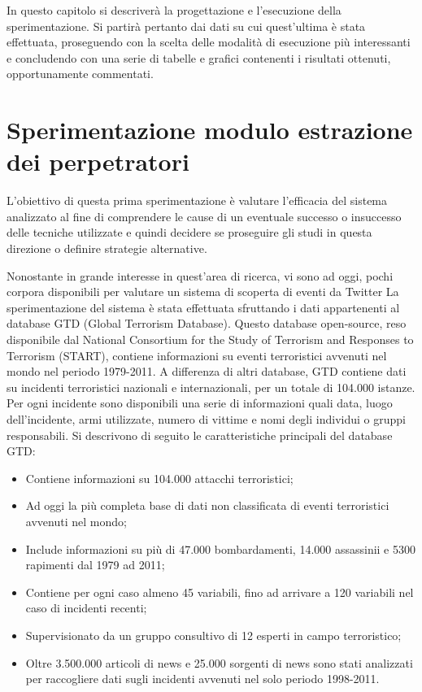 

In questo capitolo si descriverà la progettazione e l'esecuzione della sperimentazione. Si partirà pertanto dai dati su cui quest'ultima è stata effettuata, proseguendo con la scelta delle modalità di esecuzione più interessanti e concludendo con una serie di tabelle e grafici contenenti i risultati ottenuti, opportunamente commentati.  
\section{Sperimentazione modulo estrazione dei perpetratori}
L'obiettivo di questa prima sperimentazione è valutare l'efficacia del sistema analizzato al fine di comprendere le cause di un eventuale successo o insuccesso delle tecniche utilizzate e quindi decidere se proseguire gli studi in questa direzione o definire strategie alternative.


Nonostante in grande interesse in quest'area di ricerca, vi sono ad oggi, pochi corpora disponibili per valutare un sistema di scoperta di eventi da Twitter
La sperimentazione del sistema è stata effettuata sfruttando i dati appartenenti al database GTD (Global Terrorism Database)\cite{GTD}.
Questo database open-source, reso disponibile dal National Consortium for the Study of Terrorism and Responses to Terrorism (START), contiene informazioni su eventi terroristici avvenuti nel mondo nel periodo 1979-2011. A differenza di altri database, GTD contiene dati su incidenti terroristici nazionali e internazionali, per un totale di 104.000 istanze. Per ogni incidente sono disponibili una serie di informazioni quali data, luogo dell'incidente, armi utilizzate, numero di vittime e nomi degli individui o gruppi responsabili.
Si descrivono di seguito le caratteristiche principali del database GTD:
\begin{itemize}
	\item Contiene informazioni su 104.000 attacchi terroristici;
	\item Ad oggi la più completa base di dati non classificata di eventi terroristici avvenuti nel mondo;
	\item Include informazioni su più di 47.000 bombardamenti, 14.000 assassinii e 5300 rapimenti dal 1979 ad 2011;
	\item Contiene per ogni caso almeno 45 variabili, fino ad arrivare a 120 variabili nel caso di incidenti recenti;
	\item Supervisionato da un gruppo consultivo di 12 esperti in campo terroristico;
	\item Oltre 3.500.000 articoli di news e 25.000 sorgenti di news sono stati analizzati per raccogliere dati sugli incidenti avvenuti nel solo periodo 1998-2011.
\end{itemize}

